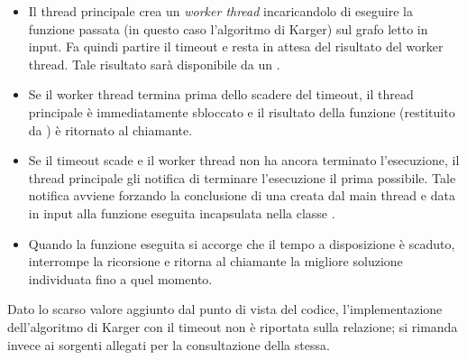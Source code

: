 \begin{itemize}
    \item Il thread principale crea un \textit{worker thread}
      incaricandolo di eseguire la funzione passata (in questo caso
      l'algoritmo di Karger) sul grafo letto in input. Fa quindi
      partire il timeout e resta in attesa del risultato del worker
      thread. Tale risultato sarà disponibile da un
      .
    \item Se il worker thread termina prima dello scadere del timeout,
      il thread principale è immediatamente sbloccato e il risultato
      della funzione (restituito da ) è
      ritornato al chiamante.
    \item Se il timeout scade e il worker thread non ha ancora
      terminato l'esecuzione, il thread principale gli notifica di
      terminare l'esecuzione il prima possibile. Tale notifica avviene
      forzando la conclusione di una  creata
      dal main thread e data in input alla funzione eseguita
      incapsulata nella classe .
    \item Quando la funzione eseguita si accorge che il tempo a
      disposizione è scaduto, interrompe la ricorsione e ritorna al
      chiamante la migliore soluzione individuata fino a quel momento.
\end{itemize}

\noindent Dato lo scarso valore aggiunto dal punto di vista del
codice, l'implementazione dell'algoritmo di Karger con il timeout non
è riportata sulla relazione; si rimanda invece ai sorgenti allegati
per la consultazione della stessa.
